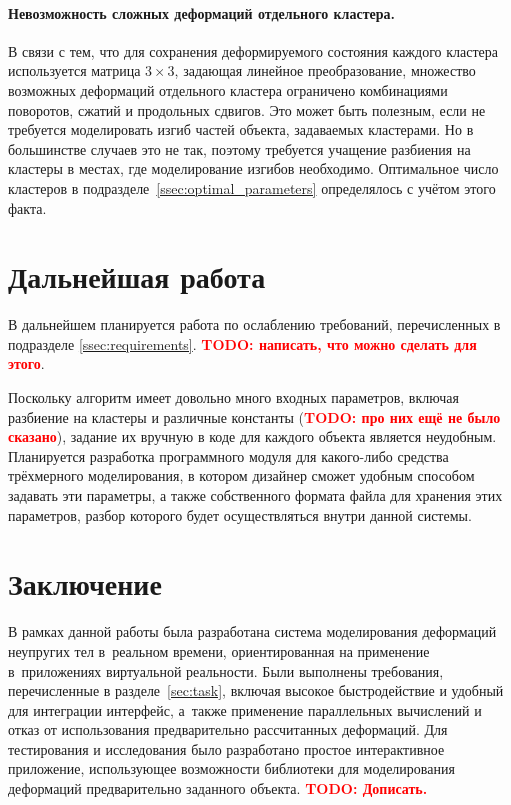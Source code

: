 \documentclass[a4paper, 14pt, titlepage]{extarticle}
\newcommand{\todo}[1]{\textbf{\textcolor{red}{TODO: #1}}}
\let\oldsection\section
\renewcommand{\section}{\newpage\oldsection}
\begin{document}
        \paragraph{Невозможность сложных деформаций отдельного кластера.} В связи с тем, что для сохранения
        деформируемого состояния каждого кластера используется матрица $3 \times 3$, задающая
        линейное преобразование, множество возможных деформаций отдельного кластера ограничено комбинациями
        поворотов, сжатий и продольных сдвигов. Это может быть полезным, если не требуется
        моделировать изгиб частей объекта, задаваемых кластерами. Но в большинстве случаев это не
        так, поэтому требуется учащение разбиения на кластеры в местах, где моделирование
        изгибов необходимо. Оптимальное число кластеров в подразделе~\ref{ssec:optimal_parameters}
        определялось с учётом этого факта.

  \section{Дальнейшая работа}

    В дальнейшем планируется работа по ослаблению требований, перечисленных
    в подразделе \ref{ssec:requirements}. \todo{написать, что можно сделать для этого}.

    Поскольку алгоритм имеет довольно много входных параметров, включая разбиение на кластеры и различные константы (\todo{про них ещё не было
    сказано}), задание их вручную в коде для каждого объекта является неудобным. Планируется
    разработка программного модуля для какого-либо средства трёхмерного моделирования, в котором
    дизайнер сможет удобным способом задавать эти параметры, а также собственного формата файла для
    хранения этих параметров, разбор которого будет осуществляться внутри данной системы.

  \section{Заключение}\label{sec:conclusion}
    В рамках данной работы была разработана система моделирования деформаций неупругих тел
    в~реальном времени, ориентированная на применение в~приложениях виртуальной реальности. Были
    выполнены требования, перечисленные в разделе~\ref{sec:task}, включая высокое быстродействие и
    удобный для интеграции интерфейс, а~также применение параллельных вычислений и отказ от
    использования предварительно рассчитанных деформаций. Для тестирования и исследования было
    разработано простое интерактивное приложение, использующее возможности библиотеки для
    моделирования деформаций предварительно заданного объекта.
    \todo{Дописать.}
\end{document}
